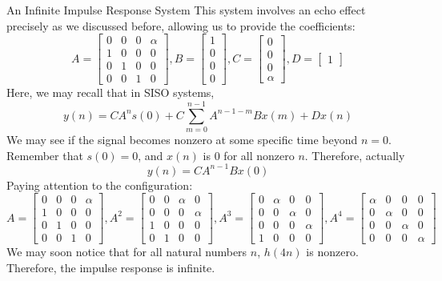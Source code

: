 \begin{ln-example}{An Infinite Impulse Response System}{}
    This system involves an echo effect precisely as we discussed before, allowing us to provide the coefficients:
    \[
        A = \begin{bmatrix}
            0 & 0 & 0 & \alpha \\
            1 & 0 & 0 & 0 \\
            0 & 1 & 0 & 0 \\
            0 & 0 & 1 & 0
        \end{bmatrix},
        B = \begin{bmatrix} 1 \\ 0 \\ 0 \\ 0 \end{bmatrix},
        C = \begin{bmatrix} 0 \\ 0 \\ 0 \\ \alpha \end{bmatrix},
        D = \begin{bmatrix} 1 \end{bmatrix}
    \]
    Here, we may recall that in SISO systems,
    \[
        y(n) = C A^n s(0) + C \sum_{m = 0}^{n - 1} A^{n - 1 - m} B x(m) + D x(n)
    \]
    We may see if the signal becomes nonzero at some specific time beyond $n = 0$.
    Remember that $s(0) = 0$, and $x(n)$ is $0$ for all nonzero $n$. Therefore, actually
    \[
        y(n) = C A^{n - 1} B x(0)
    \]
    Paying attention to the configuration:
    \[
        A = \begin{bmatrix}
            0 & 0 & 0 & \alpha \\
            1 & 0 & 0 & 0 \\
            0 & 1 & 0 & 0 \\
            0 & 0 & 1 & 0
        \end{bmatrix},
        A^2 = \begin{bmatrix}
            0 & 0 & \alpha & 0 \\
            0 & 0 & 0 & \alpha \\
            1 & 0 & 0 & 0 \\
            0 & 1 & 0 & 0
        \end{bmatrix},
        A^3 = \begin{bmatrix}
            0 & \alpha & 0 & 0 \\
            0 & 0 & \alpha & 0 \\
            0 & 0 & 0 & \alpha \\
            1 & 0 & 0 & 0
        \end{bmatrix},
        A^4 = \begin{bmatrix}
            \alpha & 0 & 0 & 0 \\
            0 & \alpha & 0 & 0 \\
            0 & 0 & \alpha & 0 \\
            0 & 0 & 0 & \alpha
        \end{bmatrix}
    \]
    We may soon notice that for all natural numbers $n$, $h(4n)$ is nonzero.
    Therefore, the impulse response is infinite.
\end{ln-example}

